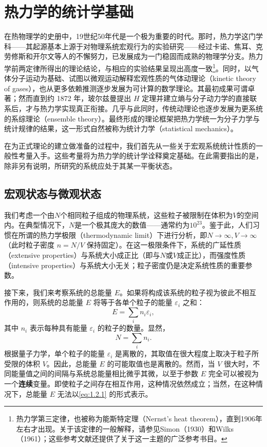 \chapter{热力学的统计学基础}\label{chap1}

在热物理学的史册中，19世纪50年代是一个极为重要的时代。那时，热力学这门学科——其起源基本上源于对物理系统宏观行为的实验研究——经过卡诺、焦耳、克劳修斯和开尔文等人的不懈努力，已发展成为一门稳固而成熟的物理学分支。热力学前两定律所得出的理论结论，与相应的实验结果呈现出高度一致\footnote{热力学第三定律，也被称为能斯特定理（Nernst's heat theorem），直到1906年左右才出现。关于该定律的一般解释，请参见Simon（1930）和Wilks（1961）；这些参考文献还提供了关于这一主题的广泛参考书目。}。同时，以气体分子运动为基础、试图以微观运动解释宏观性质的气体动理论（kinetic theory of gases），也从更多依赖推测逐步发展为可计算的数学理论。其最初成果可谓卓著；然而直到约 1872 年，玻尔兹曼提出 \(H\) 定理并建立熵与分子动力学的直接联系后，才与热力学实现真正衔接。几乎与此同时，传统动理论也逐步发展为更系统的系综理论（ensemble theory）。最终形成的理论框架把热力学统一为分子力学与统计规律的结果，这一形式自然被称为统计力学（statistical mechanics）。

在为正式理论的建立做准备的过程中，我们首先从一些关于宏观系统统计性质的一般性考量入手。这些考量将为热力学的统计学诠释奠定基础。在此需要指出的是，除非另有说明，所研究的系统应处于其某一平衡状态。

\section{宏观状态与微观状态}\label{section1.1}

我们考虑一个由\(N\)个相同粒子组成的物理系统，这些粒子被限制在体积为\(V\)的空间内。在典型情况下，\(N\)是一个极其庞大的数值——通常约为\(10^{23}\)。鉴于此，人们习惯在所谓的热力学极限（thermodynamic limit）下进行分析，即\(N \to \infty, V \to \infty\)（此时粒子密度 \(n=N/V\) 保持固定）。在这一极限条件下，系统的广延性质（extensive properties）与系统大小成正比（即与\(N\)或\(V\)成正比），而强度性质（intensive properties）与系统大小无关；粒子密度仍是决定系统性质的重要参数。

接下来，我们来考察系统的总能量 \(E\)。如果将构成该系统的粒子视为彼此不相互作用的，则系统的总能量 \(E\) 将等于各单个粒子的能量 \(\varepsilon_i\) 之和：
\begin{equation}\tag{1.2.1}\label{eq:1.2.1}
E = \sum _ { i } n _ { i } \varepsilon _ { i } ,
\end{equation}
其中 \(n_{i}\) 表示每种具有能量 \(\varepsilon_{i}\) 的粒子的数量。显然，
\begin{equation}\tag{1.2.2}\label{eq:1.2.2}
N = \sum _ { i } n _ { i } .
\end{equation}
根据量子力学，单个粒子的能量 \(\varepsilon_{i}\) 是离散的，其取值在很大程度上取决于粒子所受限的体积 \(V\)。因此，总能量 \(E\) 的可能取值也是离散的。然而，当 \(V\) 很大时，不同能量值之间的间隔与系统总能量相比微乎其微，以至于参数 \(E\) 完全可以被视为一个\textbf{连续}变量。即使粒子之间存在相互作用，这种情况依然成立；当然，在这种情况下，总能量 \(E\) 无法以\autoref{eq:1.2.1} 的形式表示。

